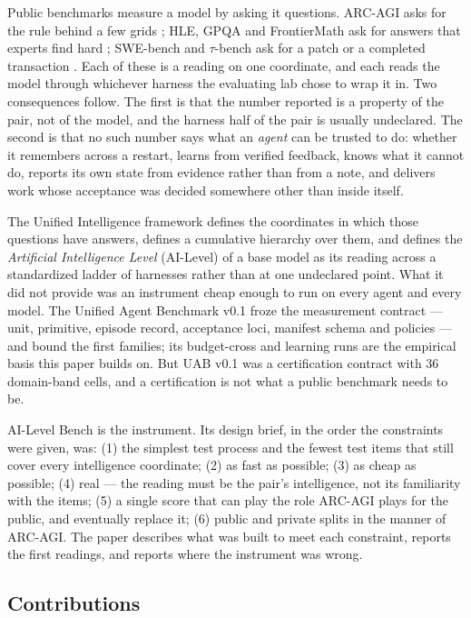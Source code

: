 Public benchmarks measure a model by asking it questions. ARC-AGI asks for the rule behind a few grids \citep{arc2026}; HLE, GPQA and FrontierMath ask for answers that experts find hard \citep{phan2025hle,rein2023gpqa,glazer2024frontiermath}; SWE-bench and $\tau$-bench ask for a patch or a completed transaction \citep{jimenez2023swebench,yao2024taubench}. Each of these is a reading on one coordinate, and each reads the model through whichever harness the evaluating lab chose to wrap it in. Two consequences follow. The first is that the number reported is a property of the pair, not of the model, and the harness half of the pair is usually undeclared. The second is that no such number says what an \emph{agent} can be trusted to do: whether it remembers across a restart, learns from verified feedback, knows what it cannot do, reports its own state from evidence rather than from a note, and delivers work whose acceptance was decided somewhere other than inside itself.

The Unified Intelligence framework \citep{yang2026unified} defines the coordinates in which those questions have answers, defines a cumulative hierarchy over them, and defines the \emph{Artificial Intelligence Level} (AI-Level) of a base model as its reading across a standardized ladder of harnesses rather than at one undeclared point. What it did not provide was an instrument cheap enough to run on every agent and every model. The Unified Agent Benchmark v0.1 \citep{yang2026uab} froze the measurement contract --- unit, primitive, episode record, acceptance loci, manifest schema and policies --- and bound the first families; its budget-cross and learning runs are the empirical basis this paper builds on. But UAB v0.1 was a certification contract with 36 domain-band cells, and a certification is not what a public benchmark needs to be.

AI-Level Bench is the instrument. Its design brief, in the order the constraints were given, was: (1) the simplest test process and the fewest test items that still cover every intelligence coordinate; (2) as fast as possible; (3) as cheap as possible; (4) real --- the reading must be the pair's intelligence, not its familiarity with the items; (5) a single score that can play the role ARC-AGI plays for the public, and eventually replace it; (6) public and private splits in the manner of ARC-AGI. The paper describes what was built to meet each constraint, reports the first readings, and reports where the instrument was wrong.

\subsection{Contributions}

